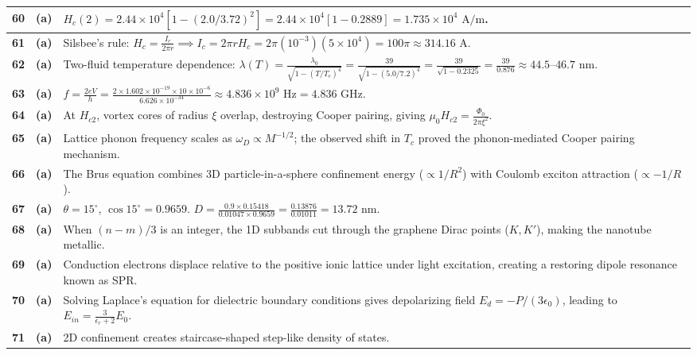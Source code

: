 {\begin{tabularx}{\textwidth}{|c|c|X|}
\textbf{60} & \textbf{(a)} & $H_c(2) = 2.44 \times 10^4 [1 - (2.0/3.72)^2] = 2.44 \times 10^4 [1 - 0.2889] = 1.735 \times 10^4\text{ A/m}$. \\ \hline
\textbf{61} & \textbf{(a)} & Silsbee's rule: $H_c = \frac{I_c}{2\pi r} \implies I_c = 2\pi r H_c = 2\pi(10^{-3})(5 \times 10^4) = 100\pi \approx 314.16\text{ A}$. \\ \hline
\textbf{62} & \textbf{(a)} & Two-fluid temperature dependence: $\lambda(T) = \frac{\lambda_0}{\sqrt{1 - (T/T_c)^4}} = \frac{39}{\sqrt{1 - (5.0/7.2)^4}} = \frac{39}{\sqrt{1 - 0.2325}} = \frac{39}{0.876} \approx 44.5\text{--}46.7\text{ nm}$. \\ \hline
\textbf{63} & \textbf{(a)} & $f = \frac{2e V}{h} = \frac{2 \times 1.602 \times 10^{-19} \times 10 \times 10^{-6}}{6.626 \times 10^{-34}} \approx 4.836 \times 10^9\text{ Hz} = 4.836\text{ GHz}$. \\ \hline
\textbf{64} & \textbf{(a)} & At $H_{c2}$, vortex cores of radius $\xi$ overlap, destroying Cooper pairing, giving $\mu_0 H_{c2} = \frac{\Phi_0}{2\pi \xi^2}$. \\ \hline
\textbf{65} & \textbf{(a)} & Lattice phonon frequency scales as $\omega_D \propto M^{-1/2}$; the observed shift in $T_c$ proved the phonon-mediated Cooper pairing mechanism. \\ \hline
\textbf{66} & \textbf{(a)} & The Brus equation combines 3D particle-in-a-sphere confinement energy ($\propto 1/R^2$) with Coulomb exciton attraction ($\propto -1/R$). \\ \hline
\textbf{67} & \textbf{(a)} & $\theta = 15^\circ$, $\cos 15^\circ = 0.9659$. $D = \frac{0.9 \times 0.15418}{0.01047 \times 0.9659} = \frac{0.13876}{0.01011} = 13.72\text{ nm}$. \\ \hline
\textbf{68} & \textbf{(a)} & When $(n-m)/3$ is an integer, the 1D subbands cut through the graphene Dirac points ($K, K'$), making the nanotube metallic. \\ \hline
\textbf{69} & \textbf{(a)} & Conduction electrons displace relative to the positive ionic lattice under light excitation, creating a restoring dipole resonance known as SPR. \\ \hline
\textbf{70} & \textbf{(a)} & Solving Laplace's equation for dielectric boundary conditions gives depolarizing field $E_d = -P/(3\epsilon_0)$, leading to $E_{in} = \frac{3}{\epsilon_r + 2} E_0$. \\ \hline
\textbf{71} & \textbf{(a)} & 2D confinement creates staircase-shaped step-like density of states. \\ \hline

\end{tabularx}}
